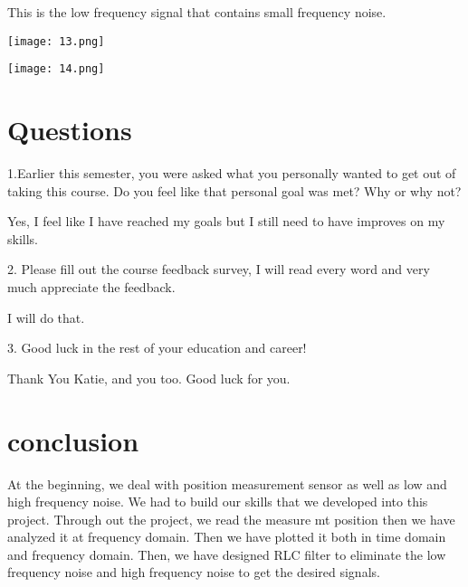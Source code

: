 \documentclass[12pt]{report}
\begin{document}
This is the low frequency signal that contains small frequency noise.

\texttt{[image: 13.png]} 


\texttt{[image: 14.png]} 














\section{Questions}

1.Earlier this semester, you were asked what you personally wanted to get out of taking this
course. Do you feel like that personal goal was met? Why or why not?

Yes, I feel like I have reached my goals but I still need to have improves on my skills. 

2. Please fill out the course feedback survey, I will read every word and very much appreciate
the feedback.

I will do that.

3. Good luck in the rest of your education and career!

Thank You Katie, and you too. Good luck for you.

\section{conclusion}

At the beginning, we deal with position measurement sensor as well as low and high frequency noise. We had to build our skills that we developed into this project. Through out the project, we read the measure mt position then we have analyzed it at frequency domain. Then we have plotted it both in time domain and frequency domain. Then, we have designed RLC filter to eliminate the low frequency noise and high frequency noise to get the desired signals. 


\newpage
\end{document}
